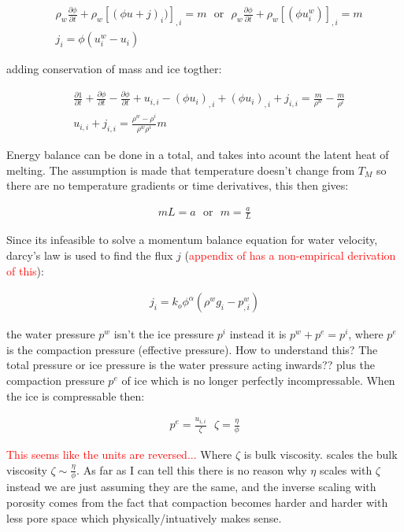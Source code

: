 \documentclass[a4paper,12pt]{article}
\newcommand{\pd}[2]{\frac{\partial #1}{\partial #2}}
\begin{document}
\begin{align}
  &\rho_w\pd{\phi}{t} + \rho_w[(\phi u + j)_i)]_{,i} = m ~~~ \text{or} ~~~ \rho_w\pd{\phi}{t} + \rho_w[(\phi u^w_i)]_{,i} = m \label{eq:conservation-water-mass}\\
  &j_i = \phi(u_i^w - u_i)
\end{align}


adding conservation of mass and ice togther:

\begin{align}
  &\pd{1}{t} + \pd{\phi}{t} - \pd{\phi}{t} + u_{i,i} - (\phi u_i)_{,i} + (\phi u_i)_{,i} + j_{i,i} = \frac{m}{\rho^w} - \frac{m}{\rho^i}\\
  & u_{i,i} + j_{i,i} = \frac{\rho^w - \rho^i}{\rho^w \rho^i} m \label{eq:conservation-total-mass}
\end{align}


Energy balance can be done in a total, and takes into acount the latent heat of melting. The assumption is made that temperature doesn't change from $T_M$ so there are no temperature gradients or time derivatives, this then gives:

\begin{align}
  mL = a ~~~ \text{or} ~~~ m = \frac{a}{L}
\end{align}

Since its infeasible to solve a momentum balance equation for water velocity, darcy's law is used to find the flux $j$ (\textcolor{red}{appendix of \cite{mckenzie_1984} has a non-empirical derivation of this}):

\begin{align}
  j_i = k_o\phi^\alpha(\rho^wg_i - p^w_{,i}) \label{eq:water-flux}
\end{align}

the water pressure $p^w$ isn't the ice pressure $p^i$ instead it is $p^w + p^e = p^i $, where $p^e$ is the compaction pressure (effective pressure). How to understand this? The total pressure or ice pressure is the water pressure acting inwards?? plus the compaction pressure $p^e$ of ice which is no longer perfectly incompressable. When the ice is compressable then:

\begin{align}
  p^e = \frac{u_{i,i}}{\zeta} ~~~ \zeta = \frac{\eta}{\phi} \label{eq:compaction-relation}
\end{align}

\textcolor{red}{This seems like the units are reversed...}  Where $\zeta$ is bulk viscosity. \cite{mckenzie_1984} scales the bulk viscosity $\zeta \sim \frac{\eta}{\phi}$. As far as I can tell this there is no reason why $\eta$ scales with $\zeta$ instead we are just assuming they are the same, and the inverse scaling with porosity comes from the fact that compaction becomes harder and harder with less pore space which physically/intuatively makes sense.
\end{document}
